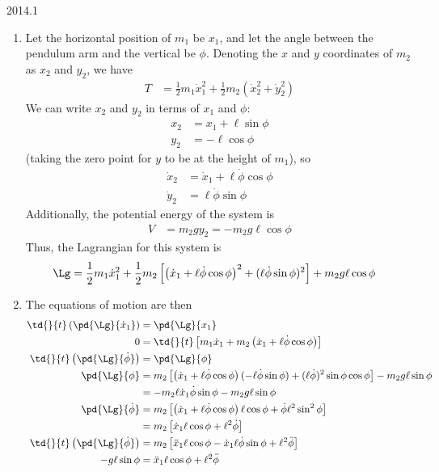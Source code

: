 \documentclass[12pt]{article}
\begin{document}
\begin{solution}{2014.1}
\begin{enumerate}
\item
Let the horizontal position of $m_1$ be $x_1$, and let the angle between the pendulum arm and the vertical be $\phi$.
Denoting the $x$ and $y$ coordinates of $m_2$ as $x_2$ and $y_2$, we have
\begin{align*}
T & = \frac{1}{2} m_1 \dot{x}_1^2 + \frac{1}{2} m_2 (\dot{x}_2^2 + \dot{y}_2^2)
\end{align*}
We can write $x_2$ and $y_2$ in terms of $x_1$ and $\phi$:
\begin{align*}
x_2 & = x_1 + \ell \sin \phi \\
y_2 & = -\ell \cos \phi
\end{align*}
(taking the zero point for $y$ to be at the height of $m_1$), so
\begin{align*}
\dot{x}_2 & = \dot{x}_1 + \ell \dot{\phi} \cos \phi \\
\dot{y}_2 & = \ell \dot{\phi} \sin \phi
\end{align*}
Additionally, the potential energy of the system is
\begin{align*}
V & = m_2 g y_2 = -m_2 g \ell \cos \phi
\end{align*}
Thus, the Lagrangian for this system is
\begin{align*}
\Lg & = \frac{1}{2} m_1 \dot{x}_1^2 
+ \frac{1}{2} m_2 \left[ \left( \dot{x}_1 + \ell \dot{\phi} \cos \phi \right)^2 + (\ell \dot{\phi} \sin \phi)^2 \right]
+ m_2 g \ell \cos \phi
\end{align*}

\item
The equations of motion are then
\begin{align*}
\td{}{t} \left( \pd{\Lg}{\dot{x}_1} \right) & = \pd{\Lg}{x_1} \\
0 & = \td{}{t} \left[ m_1 \dot{x}_1 + m_2 \left( \dot{x}_1 + \ell \dot{\phi} \cos \phi \right) \right] \\
\td{}{t} \left( \pd{\Lg}{\dot{\phi}} \right) & = \pd{\Lg}{\phi} \\
\pd{\Lg}{\phi} & = 
m_2 \left[ \left( \dot{x}_1 + \ell \dot{\phi} \cos \phi \right) (-\ell \dot{\phi} \sin \phi)
+ (\ell \dot{\phi})^2 \sin \phi \cos \phi
\right] - m_2 g \ell \sin \phi \\
& = -m_2 \ell \dot{x}_1 \dot{\phi} \sin \phi - m_2 g\ell \sin \phi \\
\pd{\Lg}{\dot{\phi}} & = m_2 \left[ \left( \dot{x}_1 + \ell \dot{\phi} \cos \phi \right) \ell \cos \phi
+ \dot{\phi} \ell^2 \sin^2 \phi \right] \\
& = m_2 \left[ \dot{x}_1 \ell \cos \phi + \ell^2 \dot{\phi} \right] \\
\td{}{t} \left( \pd{\Lg}{\dot{\phi}} \right)
& = m_2 \left[ \ddot{x}_1 \ell \cos \phi - \dot{x}_1 \ell \dot{\phi} \sin \phi + \ell^2 \ddot{\phi} \right] \\
-g\ell \sin \phi & = \ddot{x}_1 \ell \cos \phi + \ell^2 \ddot{\phi}
\end{align*}


\end{enumerate}
\end{solution}
\end{document}
